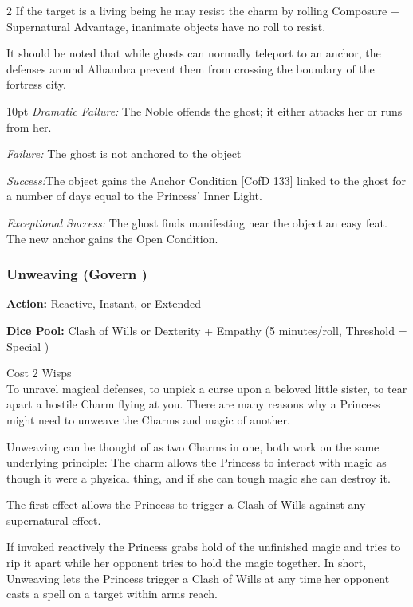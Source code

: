 \begin{multicols}{2}
If the target is a living being he may resist the charm by rolling Composure + Supernatural Advantage, inanimate objects have no roll to resist. 

It should be noted that while ghosts can normally teleport to an anchor, the defenses around Alhambra prevent them from crossing the boundary of the fortress city.


\begin{myindentpar}{10pt} \emph{Dramatic Failure:} The Noble offends the ghost; it either attacks her or runs from her.

\emph{Failure:} The ghost is not anchored to the object

\emph{Success:}The object gains the Anchor Condition [CofD 133] linked to the ghost for a number of days equal to the Princess’ Inner Light.

\emph{Exceptional Success:}	 The ghost finds manifesting near the object an easy feat. The new anchor gains the Open Condition.

\end{myindentpar}

\subsubsection*{Unweaving (Govern \textbullet\textbullet\textbullet\textbullet)}

\noindent \textbf{Action:} Reactive, Instant, or Extended

\noindent \textbf{Dice Pool:} Clash of Wills or Dexterity + Empathy (5 minutes/roll, Threshold = Special )

\noindent Cost 2 Wisps\\

To unravel magical defenses, to unpick a curse upon a beloved little sister, to tear apart a hostile Charm flying at you. There are many reasons why a Princess might need to unweave the Charms and magic of another. 

Unweaving can be thought of as two Charms in one, both work on the same underlying principle: The charm allows the Princess to interact with magic as though it were a physical thing, and if she can tough magic she can destroy it.

The first effect allows the Princess to trigger a Clash of Wills against any supernatural effect. 

If invoked reactively the Princess grabs hold of the unfinished magic and tries to rip it apart while her opponent tries to hold the magic together. In short, Unweaving lets the Princess trigger a Clash of Wills at any time her opponent casts a spell on a target within arms reach.


\end{multicols}
